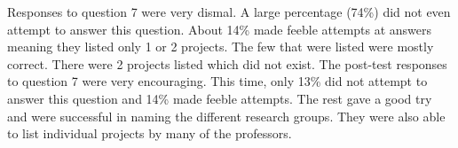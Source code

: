 Responses to question 7 were very dismal.  A large percentage (74\%) did not
even attempt to answer this question.  About 14\% made feeble attempts at
answers meaning they listed only 1 or 2 projects.  The few that were listed
were mostly correct.  There were 2 projects listed which did not exist.  The
post-test responses to question 7 were very encouraging.  This time, only 13\%
did not attempt to answer this question and 14\% made feeble attempts.  The
rest gave a good try and were successful in naming the different research
groups.  They were also able to list individual projects by many of the
professors.

